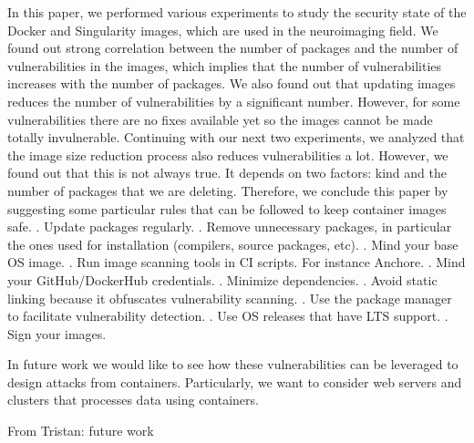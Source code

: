 \documentclass[a4paper,num-refs]{oup-contemporary}
\newcommand{\tristan}[1]{\color{blue}From Tristan: #1\color{black}}
\begin{document}
In this paper, we performed various experiments to study the security state of the Docker
and Singularity images, which are used in the neuroimaging field. We found out strong correlation
between the number of packages and the number of vulnerabilities in the images, which implies
that the number of vulnerabilities increases with the number of packages. We also found out that
updating images reduces the number of vulnerabilities by a significant number. However, for some
vulnerabilities there are no fixes available yet so the images cannot 
be made totally invulnerable. Continuing with our next two experiments, we analyzed that the
image size reduction process also reduces vulnerabilities a lot. However, we found out that this is not
always true. It depends on two factors: kind and the number of packages that we are
deleting. Therefore, we conclude this paper by suggesting some particular rules that can be
followed to keep container images safe.
. Update packages regularly.
. Remove unnecessary packages, in particular the ones used for installation (compilers, source packages, etc).
. Mind your base OS image.
. Run image scanning tools in CI scripts. For instance Anchore.
. Mind your GitHub/DockerHub credentials.
. Minimize dependencies.
. Avoid static linking because it obfuscates vulnerability scanning.
. Use the package manager to facilitate vulnerability detection.
. Use OS releases that have LTS support.
. Sign your images.

In future work we would like to see how these vulnerabilities can be leveraged
to design attacks from containers. Particularly, we want
to consider web servers and clusters that processes data using containers.

\tristan{future work}


\end{document}
